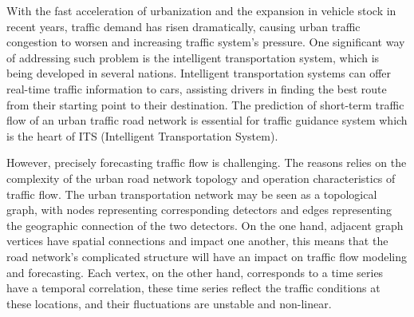 \documentclass[conference]{IEEEtran}
\begin{document}
With the fast acceleration of urbanization and the expansion in vehicle stock in recent years, traffic demand has risen dramatically, causing urban traffic congestion to worsen and increasing traffic system's pressure. One significant way of addressing such problem is the intelligent transportation system, which is being developed in several nations. Intelligent transportation systems can offer real-time traffic information to cars, assisting drivers in finding the best route from their starting point to their destination. The prediction of short-term traffic flow of an urban traffic road network is essential for traffic guidance system which is the heart of ITS (Intelligent Transportation System)\cite{b1}.
\par However, precisely forecasting traffic flow is challenging. The reasons relies on the complexity of the urban road network topology and operation characteristics of traffic flow. The urban transportation network may be seen as a topological graph, with nodes representing corresponding detectors and edges representing the geographic connection of the two detectors.  
On the one hand, adjacent graph vertices have spatial connections and impact one another, this means that the road network's complicated structure will have an impact on traffic flow modeling and forecasting. Each vertex, on the other hand, corresponds to a time series have a temporal correlation, these time series reflect the traffic conditions at these locations, and their fluctuations are unstable and non-linear\cite{b2}.
\end{document}
